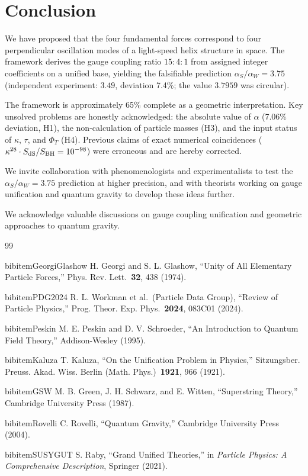 \documentclass[aps,prd,10pt]{revtex4-2}
\begin{document}
\section{Conclusion}

We have proposed that the four fundamental forces correspond to four
perpendicular oscillation modes of a light-speed helix structure in space.
The framework derives the gauge coupling ratio $15 : 4 : 1$ from assigned integer
coefficients on a unified base, yielding the falsifiable prediction
$\alpha_S/\alpha_W = 3.75$ (independent experiment: $3.49$, deviation 7.4\%; the value $3.7959$ was circular).

The framework is approximately 65\% complete as a geometric interpretation.
Key unsolved problems are honestly acknowledged: the absolute value of $\alpha$
(7.06\% deviation, H1), the non-calculation of particle masses (H3), and the
input status of $\kappa$, $\tau$, and $\Phi_T$ (H4). Previous claims of exact
numerical coincidences ($\kappa^{28}\cdot S_{\rm dS}/S_{\rm BH} = 10^{-98}$)
were erroneous and are hereby corrected.

We invite collaboration with phenomenologists and experimentalists to test
the $\alpha_S/\alpha_W = 3.75$ prediction at higher precision, and with
theorists working on gauge unification and quantum gravity to develop these
ideas further.

\begin{acknowledgments}
We acknowledge valuable discussions on gauge coupling unification and
geometric approaches to quantum gravity.
\end{acknowledgments}

\begin{thebibliography}{99}

 bibitem{GeorgiGlashow}
 H. Georgi and S. L. Glashow,
 ``Unity of All Elementary Particle Forces,''
 Phys. Rev. Lett.\ {\bf 32}, 438 (1974).

 bibitem{PDG2024}
 R. L. Workman et al.\ (Particle Data Group),
 ``Review of Particle Physics,''
 Prog. Theor. Exp. Phys.\ {\bf 2024}, 083C01 (2024).

 bibitem{Peskin}
 M. E. Peskin and D. V. Schroeder,
 ``An Introduction to Quantum Field Theory,''
 Addison-Wesley (1995).

 bibitem{Kaluza}
 T. Kaluza,
 ``On the Unification Problem in Physics,''
 Sitzungsber. Preuss. Akad. Wiss. Berlin (Math. Phys.)\ {\bf 1921}, 966 (1921).

 bibitem{GSW}
 M. B. Green, J. H. Schwarz, and E. Witten,
 ``Superstring Theory,''
 Cambridge University Press (1987).

 bibitem{Rovelli}
 C. Rovelli,
 ``Quantum Gravity,''
 Cambridge University Press (2004).

 bibitem{SUSYGUT}
 S. Raby,
 ``Grand Unified Theories,''
 in \textit{Particle Physics: A Comprehensive Description},
 Springer (2021).

\end{thebibliography}
\end{document}
